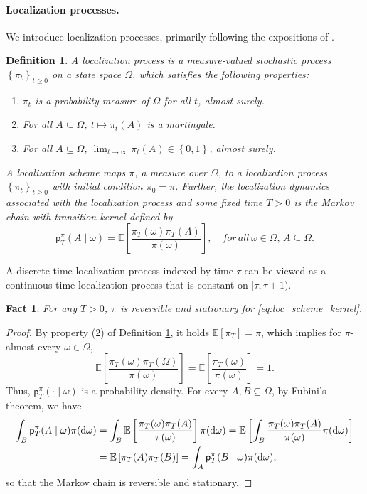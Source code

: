 \documentclass[11pt]{article}
\newtheorem{fact}{Fact}
\newtheorem{definition}{Definition}
\newcommand{\E}{\mathbb{E}}
\newcommand{\dd}{\textup{d}}
\newcommand{\Brack}[1]{\left[#1\right]}
\newcommand{\Brace}[1]{\left\{#1\right\}}
\newcommand{\0}{\mathbf{0}}
\newcommand{\1}{\mathbf{1}}
\begin{document}
\paragraph{Localization processes.} We introduce localization processes, primarily following the expositions of \cite{ChenE22,ShiTZ25}.
\begin{definition}\label{def:loc_process}
    A \emph{localization process} is a measure-valued stochastic process $\Brace{\pi_t}_{t\ge0}$ on a state space $\Omega$, which satisfies the following properties:
    \begin{enumerate}
        \item[(1)] $\pi_t$ is a probability measure of $\Omega$ for all $t$, almost surely.
        \item[(2)] For all $A\subseteq \Omega$, $t \mapsto \pi_t(A)$ is a martingale.
        \item[(3)] For all $A\subseteq \Omega$, $\lim_{t\to\infty}\pi_t(A) \in \Brace{0,1}$, almost surely.
    \end{enumerate}
        A \emph{localization scheme} maps $\pi$, a measure over $\Omega$, to a localization process $\Brace{\pi_t}_{t\ge0}$ with initial condition $\pi_0=\pi$. Further, the \emph{localization dynamics} associated with the localization process and some fixed time $T>0$ is the Markov chain with transition kernel defined by \begin{equation}
        \mathsf{p}_T^\pi(A\mid \omega) = \E\Brack{\frac{\pi_T(\omega)\pi_T(A)}{\pi(\omega)}},\quad for\, all\,\omega\in \Omega,\,A\subseteq\Omega.\label{eq:loc_scheme_kernel}
        \end{equation}
\end{definition}

A discrete-time localization process indexed by time $\tau$ can be viewed as a continuous time localization process that is constant on $[\tau, \tau+1)$.

\begin{fact}
    For any $T>0$, $\pi$ is reversible and stationary for \eqref{eq:loc_scheme_kernel}.
\end{fact}
\begin{proof}
    By property (2) of Definition \ref{def:loc_process}, it holds $\E[\pi_T]=\pi$, which implies for $\pi$-almost every $\omega\in\Omega$, \[
    \E\Brack{\frac{\pi_T(\omega)\pi_T(\Omega)}{\pi(\omega)}} = \E\Brack{\frac{\pi_T(\omega)}{\pi(\omega)}}=1.
    \]
    Thus, $\mathsf{p}_T^\pi(\cdot\mid \omega)$ is a probability density. For every $A,B\subseteq \Omega$, by Fubini's theorem, we have \begin{align*}
        \int_B\mathsf{p}_T^\pi(A\mid \omega)\pi(\dd\omega) &= \int_B \E\Brack{\frac{\pi_T(\omega)\pi_T(A)}{\pi(\omega)}}\pi(\dd\omega) = \E\Brack{\int_B\frac{\pi_T(\omega)\pi_T(A)}{\pi(\omega)}\pi(\dd\omega)}\\
        &= \E\Brack{\pi_T(A)\pi_T(B)} = \int_A\mathsf{p}_T^\pi(B\mid \omega)\pi(\dd\omega),
    \end{align*}
so that the Markov chain is reversible and stationary.
\end{proof}
\end{document}
